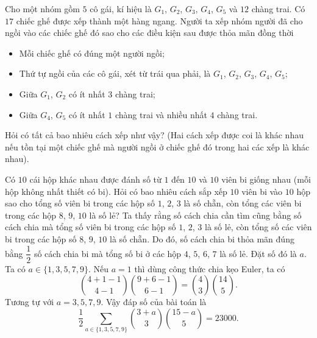 \begin{bt}%
 Cho một nhóm gồm $5$ cô gái, kí hiệu là $G_1$, $G_2$, $G_3$, $G_4$, $G_5$ và $12$ chàng trai. Có $17$ chiếc ghế được xếp thành một hàng ngang. Người ta xếp nhóm người đã cho ngồi vào các chiếc ghế đó sao cho các điều kiện sau được thỏa mãn đồng thời
		\begin{itemize}
			\item Mỗi chiếc ghế có đúng một người ngồi;
			\item Thứ tự ngồi của các cô gái, xét từ trái qua phải, là $G_1$, $G_2$, $G_3$, $G_4$, $G_5$;
			\item Giữa $G_1$, $G_2$ có ít nhất $3$ chàng trai;
			\item Giữa $G_4$, $G_5$ có ít nhất $1$ chàng trai và nhiều nhất $4$ chàng trai.
		\end{itemize}
		Hỏi có tất cả bao nhiêu cách xếp như vậy? (Hai cách xếp được coi là khác nhau nếu tồn tại một chiếc ghế mà người ngồi ở chiếc ghế đó trong hai các xếp là khác nhau).
\end{bt}

\begin{bt}%
 Có $10$ cái hộp khác nhau được đánh số từ $1$ đến $10$ và $10$ viên bi giống nhau (mỗi hộp không nhất thiết có bi). Hỏi có bao nhiêu cách sắp xếp $10$ viên bi vào $10$ hộp sao cho tổng số viên bi trong các hộp số $1$, $2$, $3$ là số chẵn, còn tổng các viên bi trong các hộp $8$, $9$, $10$ là số lẻ?
 \loigiai
 {
 Ta thấy rằng số cách chia cần tìm cũng bằng số cách chia mà tổng số viên bi trong các hộp số $1$, $2$, $3$ là số lẻ, còn tổng số các viên bi trong các hộp số $8$, $9$, $10$ là số chẵn. Do đó, số cách chia bi thỏa mãn đúng bằng $\dfrac{1}{2}$ số cách chia bi mà tổng số bi ở các hộp $4$, $5$, $6$, $7$ là số lẻ. Đặt số đó là $a$. Ta có $a\in \{1,3,5,7,9\}$. Nếu $a=1$ thì dùng công thức chia kẹo Euler, ta có
 \[\binom{4+1-1}{4-1}\binom{9+6-1}{6-1}=\binom{4}{3}\binom{14}{5}.\]
 Tương tự với $a=3,5,7,9$. Vậy đáp số của bài toán là
 \[\dfrac{1}{2}\sum\limits_{a\in \{1,3,5,7,9\}} \binom{3+a}{3}\binom{15-a}{5}=23000.\]
 }
\end{bt}

